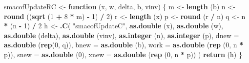 \documentclass[12pt,]{article}
\newenvironment{Shaded}{\begin{snugshade}}{\end{snugshade}}
\newcommand{\KeywordTok}[1]{\textcolor[rgb]{0.13,0.29,0.53}{\textbf{#1}}}
\newcommand{\DataTypeTok}[1]{\textcolor[rgb]{0.13,0.29,0.53}{#1}}
\newcommand{\DecValTok}[1]{\textcolor[rgb]{0.00,0.00,0.81}{#1}}
\newcommand{\StringTok}[1]{\textcolor[rgb]{0.31,0.60,0.02}{#1}}
\newcommand{\ControlFlowTok}[1]{\textcolor[rgb]{0.13,0.29,0.53}{\textbf{#1}}}
\newcommand{\OperatorTok}[1]{\textcolor[rgb]{0.81,0.36,0.00}{\textbf{#1}}}
\newcommand{\NormalTok}[1]{#1}
\begin{document}
\begin{Shaded}
\begin{Highlighting}[]
\NormalTok{smacofUpdateRC <-}\StringTok{ }\ControlFlowTok{function}\NormalTok{ (x, w, delta, b, vinv) \{}
\NormalTok{  m <-}\StringTok{ }\KeywordTok{length}\NormalTok{ (b)}
\NormalTok{  n <-}\StringTok{ }\KeywordTok{round}\NormalTok{ ((}\KeywordTok{sqrt}\NormalTok{ (}\DecValTok{1} \OperatorTok{+}\StringTok{ }\DecValTok{8} \OperatorTok{*}\StringTok{ }\NormalTok{m) }\OperatorTok{-}\StringTok{ }\DecValTok{1}\NormalTok{) }\OperatorTok{/}\StringTok{ }\DecValTok{2}\NormalTok{)}
\NormalTok{  r <-}\StringTok{ }\KeywordTok{length}\NormalTok{ (x)}
\NormalTok{  p <-}\StringTok{ }\KeywordTok{round}\NormalTok{ (r }\OperatorTok{/}\StringTok{ }\NormalTok{n)}
\NormalTok{  q <-}\StringTok{ }\NormalTok{n }\OperatorTok{*}\StringTok{ }\NormalTok{(n }\OperatorTok{-}\StringTok{ }\DecValTok{1}\NormalTok{) }\OperatorTok{/}\StringTok{ }\DecValTok{2}
\NormalTok{  h <-}
\StringTok{    }\KeywordTok{.C}\NormalTok{(}
      \StringTok{"smacofUpdateC"}\NormalTok{,}
      \KeywordTok{as.double}\NormalTok{ (x),}
      \KeywordTok{as.double}\NormalTok{ (w),}
      \KeywordTok{as.double}\NormalTok{ (delta),}
      \KeywordTok{as.double}\NormalTok{ (vinv),}
      \KeywordTok{as.integer}\NormalTok{ (n),}
      \KeywordTok{as.integer}\NormalTok{ (p),}
      \DataTypeTok{dnew =} \KeywordTok{as.double}\NormalTok{ (}\KeywordTok{rep}\NormalTok{(}\DecValTok{0}\NormalTok{, q)),}
      \DataTypeTok{bnew =} \KeywordTok{as.double}\NormalTok{ (b),}
      \DataTypeTok{work =} \KeywordTok{as.double}\NormalTok{ (}\KeywordTok{rep}\NormalTok{ (}\DecValTok{0}\NormalTok{, n }\OperatorTok{*}\StringTok{ }\NormalTok{p)),}
      \DataTypeTok{snew =} \KeywordTok{as.double}\NormalTok{ (}\DecValTok{0}\NormalTok{),}
      \DataTypeTok{xnew =} \KeywordTok{as.double}\NormalTok{ (}\KeywordTok{rep}\NormalTok{ (}\DecValTok{0}\NormalTok{, n }\OperatorTok{*}\StringTok{ }\NormalTok{p))}
\NormalTok{    )}
  \KeywordTok{return}\NormalTok{ (h)}
\NormalTok{\}}


\end{Highlighting}
\end{Shaded}
\end{document}
